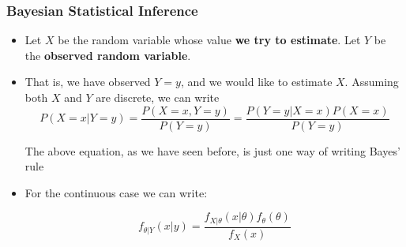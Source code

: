 \begin{frame}
    \frametitle{Bayesian Statistical Inference}


    \begin{itemize}
        \item Let $X$ be the random variable whose value \textbf{we try to estimate}. Let $Y$ be the \textbf{observed random variable}. 

        \item That is, we have observed $Y=y$, and we would like to estimate $X$. Assuming both $X$ and $Y$ are discrete, we can write
        \small
        $$P(X=x|Y=y) = \frac{P(X=x, Y=y)}{P(Y=y)} = \frac{P(Y=y|X=x)P(X=x)}{P(Y=y)}$$
        
        The above equation, as we have seen before, is just one way of writing Bayes' rule

        \item For the continuous case we can write:

        $$f_{\theta|Y}(x|y) = \frac{f_{X|\theta}(x|\theta)f_{\theta}(\theta)}{f_X(x)}$$
    \end{itemize}

\end{frame}


